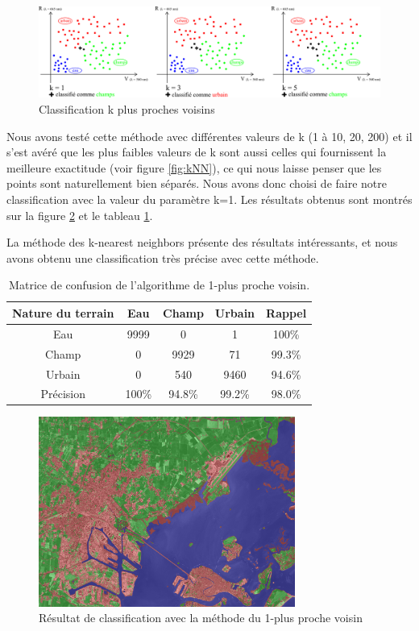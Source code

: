 \documentclass[a4paper,10pt]{article}
\begin{document}
\begin{figure}[H]
  \centering
    \includegraphics[width=1.1\textwidth]{ml_knn}
  \caption{Classification k plus proches voisins}
  \label{fig:ml_knn}
\end{figure}

Nous avons testé cette méthode avec différentes valeurs de k (1 à 10, 20, 200) et il s'est avéré que les plus faibles valeurs de k sont aussi celles qui fournissent la meilleure exactitude (voir figure \ref{fig:kNN}), ce qui nous laisse penser que les points sont naturellement bien séparés. Nous avons donc choisi de faire notre classification avec la valeur du paramètre k=1. Les résultats obtenus sont montrés sur la figure \ref{fig:1NN} et le tableau \ref{table:1NN}.

La méthode des k-nearest neighbors présente des résultats intéressants, et nous avons obtenu une classification très précise avec cette méthode. 

\begin{table}[H]
\begin{center}
 \begin{tabular}{|c|c|c|c|c|}
  \hline
  Nature du terrain & Eau & Champ  & Urbain & Rappel \\
  \hline
Eau & 9999 & 0 & 	1 &	100\% \\
Champ & 0 &	9929 &	71 &	99.3\% \\
Urbain &  0 &	540 &	9460 &	94.6\% \\
Précision & 100\% & 94.8\% & 99.2\% & {\color{red}98.0\%} \\
  \hline
\end{tabular}
\end{center}
\caption{Matrice de confusion de l'algorithme de 1-plus proche voisin.}
\label{table:1NN}
\end{table}

\begin{figure}[H]
  \centering
    \includegraphics[width=0.75\textwidth]{resultat1NN}
  \caption{Résultat de classification avec la méthode du 1-plus proche voisin}
  \label{fig:1NN}
\end{figure}
\end{document}

